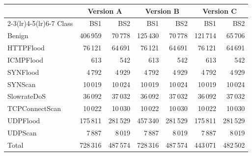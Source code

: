 \begin{tabular}{l rr rr rr}
\toprule
& \multicolumn{2}{c}{Version A} & \multicolumn{2}{c}{Version B} & \multicolumn{2}{c}{Version C}\\
\cmidrule(lr){2-3}\cmidrule(lr){4-5}\cmidrule(lr){6-7}
Class & BS1 & BS2 & BS1 & BS2 & BS1 & BS2\\
\midrule
Benign & 406\,959 & 70\,778 & 125\,430 & 70\,778 & 121\,714 & 65\,706\\
HTTPFlood & 76\,121 & 64\,691 & 76\,121 & 64\,691 & 76\,121 & 64\,691\\
ICMPFlood & 613 & 542 & 613 & 542 & 613 & 542\\
SYNFlood & 4\,792 & 4\,929 & 4\,792 & 4\,929 & 4\,792 & 4\,929\\
SYNScan & 10\,019 & 10\,024 & 10\,019 & 10\,024 & 10\,019 & 10\,024\\
SlowrateDoS & 36\,092 & 37\,032 & 36\,092 & 37\,032 & 36\,092 & 37\,032\\
TCPConnectScan & 10\,022 & 10\,030 & 10\,022 & 10\,030 & 10\,022 & 10\,030\\
UDPFlood & 175\,811 & 281\,529 & 457\,340 & 281\,529 & 175\,811 & 281\,529\\
UDPScan & 7\,887 & 8\,019 & 7\,887 & 8\,019 & 7\,887 & 8\,019\\
\midrule
Total & 728\,316 & 487\,574 & 728\,316 & 487\,574 & 443\,071 & 482\,502\\
\bottomrule
\end{tabular}
